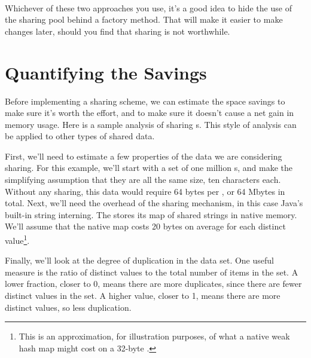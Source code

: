 \paragraph{} Whichever of these two approaches you use, it's a good idea to hide
the use of the sharing pool behind a factory method. That will make it easier to make
changes later, should you find that sharing is not worthwhile.



\section{Quantifying the Savings}
\label{sec:quantifying-sharing-savings}

Before implementing a sharing scheme, we can estimate the
space savings to make sure it's worth
the effort, and to make sure it doesn't cause a net gain in
memory usage. Here is a sample analysis of sharing s.
This style of analysis can be applied to other types of shared data.

First, we'll need to estimate
a few properties of the data we are considering sharing. For this example,
we'll start with a set of one million s, and make the
simplifying assumption that they are all the same size, ten characters each.
Without any sharing, this data would require 64 bytes per ,
or 64 Mbytes in total. Next, we'll need the overhead
of the sharing mechanism, in this case Java's built-in string interning. The
\jre stores its map of shared strings in native memory. We'll assume that the
native map costs 20 bytes on average for each distinct value\footnote{This is
an approximation, for illustration purposes, of what
a native weak hash map might cost on a 32-byte \jre.}. 

Finally, we'll look at the degree of duplication in the data set. One
useful measure is the ratio of distinct values to the total number of items in the set. 
A lower fraction, closer to 0, means there are more duplicates, since
there are fewer distinct values in the set. A higher value, closer to 1, means
there are more distinct values, so less duplication. 

